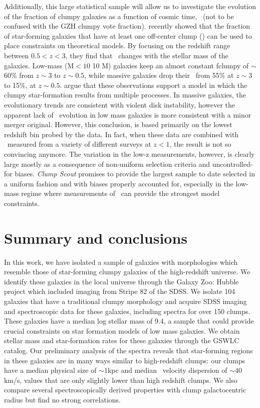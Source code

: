 Additionally, this large statistical sample will allow us to investigate the evolution of the fraction of clumpy galaxies as a function of cosmic time, \fclump~(not to be confused with the GZH clumpy vote fraction). \cite{Guo2015} recently showed that the fraction of star-forming galaxies that have at least one off-center clump (\fclump) can be used to place constraints on theoretical models. By focusing on the redshift range between $0.5 <z<3$, they find that \fclump~changes with the stellar mass of the galaxies. Low-mass (M$<10$ 10 M) galaxies keep an almost constant fclumpy of $\sim$60\% from $z\sim3$ to $z\sim0.5$, while massive galaxies drop their \fclump~from 55\% at $z\sim3$ to 15\%, at $z\sim0.5$. \cite{Guo2015} argue that these observations support a model in which the clumpy star-formation results from multiple processes. In massive galaxies, the evolutionary trends are consistent with violent disk instability, however the apparent lack of \fclump~evolution in low mass galaxies is more consistent with a minor merger original. However, this conclusion, is based primarily on the lowest redshift bin probed by the \cite{Guo2015} data. In fact, when these data are combined with \fclump~measured from a variety of different surveys at $z<1$, the result is not so convincing anymore. The variation in the low-z measurements, however, is clearly large mostly as a consequence of non-uniform selection criteria and uncontrolled-for biases. \textit{Clump Scout} promises to provide the largest sample to date selected in a uniform fashion and with biases properly accounted for, especially in the low-mass regime where measurements of \fclump~can provide the strongest model constraints.



\section{Summary and conclusions}\label{chap5: summary}

In this work, we have isolated a sample of galaxies with morphologies which resemble those of star-forming clumpy galaxies of the high-redshift universe. We identify these galaxies in the local universe through the Galaxy Zoo: Hubble project which included imaging from Stripe 82 of the SDSS. We isolate 104 galaxies that have a traditional clumpy morphology and acquire SDSS imaging and spectroscopic data for these galaxies, including spectra for over 150 clumps. These galaxies have a median log stellar mass of 9.4, a sample that could provide crucial constraints on star formation models of low mass galaxies. We obtain stellar mass and star-formation rates for these galaxies through the GSWLC catalog. Our preliminary analysis of the spectra reveals that star-forming regions in these galaxies are in many ways similar to high-redshift clumps: our clumps have a median physical size of $\sim1$kpc and median \ha~velocity dispersion of $\sim40$km/s, values that are only slightly lower than high redshift clumps. We also compare several spectroscopically derived properties with clump galactocentric radius but find no strong correlations. 

